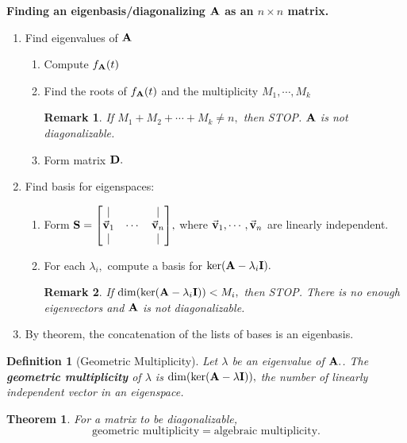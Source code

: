 \documentclass[12pt, a4paper]{article}
\newtheorem{thm}{Theorem}[subsection]
\newtheorem{df}{Definition}[subsection]
\newtheorem*{rmk}{\indent Remark}
\def\vecv{\va{v}}
\def\matrixA{\vb{A}}
\def\matrixD{\vb{D}}
\def\matrixI{\vb{I}}
\def\matrixS{\vb{S}}
\begin{document}
\begin{framed}
\textbf{Finding an eigenbasis/diagonalizing $\matrixA$ as an $n\times n$ matrix.}
\begin{enumerate}
	\item Find eigenvalues of $\matrixA$
	\begin{enumerate}
		\item Compute $f_{\matrixA}(t)$
		\item Find the roots of $f_{\matrixA}(t)$ and the multiplicity $M_1,\cdots,M_k$
		\begin{rmk}
			If $M_1+M_2+\cdots+M_k\neq n,$ then STOP. $\matrixA$ is not diagonalizable.
		\end{rmk}
		\item Form matrix $\matrixD.$
	\end{enumerate}
	\item Find basis for eigenspaces: 
	\begin{enumerate}
		\item Form $\matrixS=\mqty[|&&|\\\vecv_1&\cdots&\vecv_n\\|&&|],$ where $\vecv_1,\cdots,\vecv_n$ are linearly independent. 
		\item For each $\lambda_i,$ compute a basis for $\ker(\matrixA-\lambda_i\matrixI).$
		\begin{rmk}
			If 	$\dim(\ker(\matrixA-\lambda_i\matrixI))<M_i,$ then STOP. There is no enough eigenvectors and $\matrixA$ is not diagonalizable.
		\end{rmk}
	\end{enumerate}
	\item By theorem, the concatenation of the lists of bases is an eigenbasis. 
\end{enumerate}
\end{framed}
\begin{df}[Geometric Multiplicity]
	Let $\lambda$ be an eigenvalue of $\matrixA.$. The \textbf{geometric multiplicity} of $\lambda$ is $\dim(\ker(\matrixA-\lambda\matrixI)),$ the number of linearly independent vector in an eigenspace.
\end{df}
\begin{thm}
	For a matrix to be diagonalizable, \[\text{geometric multiplicity}=\text{algebraic multiplicity}.\]	
\end{thm}
\end{document}
